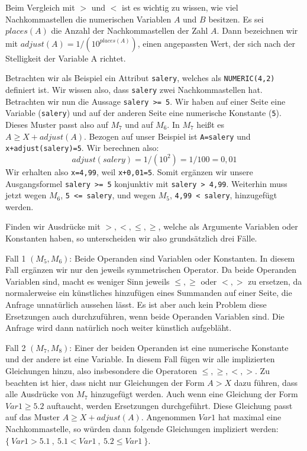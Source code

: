 Beim Vergleich mit $>$ und $<$ ist es wichtig zu wissen, wie viel Nachkommastellen die numerischen Variablen $A$ und $B$ besitzen. Es sei $\mathit{places}(A)$ die Anzahl der Nachkommastellen der Zahl $A$. Dann bezeichnen wir mit $\mathit{adjust}(A) = 1 / (10^{\mathit{places}(A)})$, einen angepassten Wert, der sich nach der Stelligkeit der Variable A richtet.

Betrachten wir als Beispiel ein Attribut \verb|salery|, welches als \verb|NUMERIC(4,2)| definiert ist. Wir wissen also, dass \verb|salery| zwei Nachkommastellen hat. Betrachten wir nun die Aussage \verb|salery >= 5|.
Wir haben auf einer Seite eine Variable (\verb|salery|) und auf der anderen Seite eine numerische Konstante (\verb|5|). Dieses Muster passt also auf $M_7$ und auf $M_6$. In $M_7$ heißt es $A\geq X+\mathit{adjust}(A)$. Bezogen auf unser Beispiel ist \verb|A=salery| und \verb|x+adjust(salery)=5|. Wir berechnen also: 
$$\mathit{adjust}(\mathit{salery}) = 1 / (10^{2}) = 1/100 = 0,01$$
Wir erhalten also \verb|x=4,99|, weil \verb|x+0,01=5|. Somit ergänzen wir unsere Ausgangsformel \verb|salery >= 5| konjunktiv mit \verb|salery > 4,99|. Weiterhin muss jetzt wegen $M_6$, \verb|5 <= salery|, und wegen $M_5$, \verb|4,99 < salery|, hinzugefügt werden.

Finden wir Ausdrücke mit $>,<,\leq,\geq$, welche als Argumente Variablen oder Konstanten haben, so unterscheiden wir also grundsätzlich drei Fälle.

Fall 1 $(M_5,M_6)$: Beide Operanden sind Variablen oder Konstanten. In diesem Fall ergänzen wir nur den jeweils symmetrischen Operator. Da beide Operanden Variablen sind, macht es weniger Sinn jeweils $\leq,\geq$ oder $<,>$ zu ersetzen, da normalerweise ein künstliches hinzufügen eines Summanden auf einer Seite, die Anfrage unnatürlich aussehen lässt. Es ist aber auch kein Problem diese Ersetzungen auch durchzuführen, wenn beide Operanden Variablen sind. Die Anfrage wird dann natürlich noch weiter künstlich aufgebläht.

Fall 2 $(M_7,M_8)$: Einer der beiden Operanden ist eine numerische Konstante und der andere ist eine Variable. In diesem Fall fügen wir alle implizierten Gleichungen hinzu, also insbesondere die Operatoren $\leq,\geq,<,>$. Zu beachten ist hier, dass nicht nur Gleichungen der Form $A>X$ dazu führen, dass alle Ausdrücke von $M_7$ hinzugefügt werden. Auch wenn eine Gleichung der Form $Var1\geq 5.2$ auftaucht, werden Ersetzungen durchgeführt. Diese Gleichung passt auf das Muster $A\geq X+\mathit{adjust}(A)$. Angenommen $Var1$ hat maximal eine Nachkommastelle, so würden dann folgende Gleichungen impliziert werden: $\{\ Var1>5.1\ ,\ 5.1<Var1\ ,\ 5.2 \leq Var1\ \}$.

